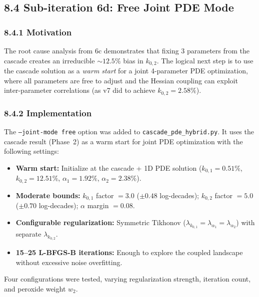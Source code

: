 \documentclass[11pt]{article}
\begin{document}
\subsection*{8.4 Sub-iteration 6d: Free Joint PDE Mode}

\subsubsection*{8.4.1 Motivation}

The root cause analysis from 6c demonstrates that fixing 3 parameters from
the cascade creates an irreducible ${\sim}12.5\%$ bias in $k_{0,2}$.  The
logical next step is to use the cascade solution as a \emph{warm start}
for a joint 4-parameter PDE optimization, where all parameters are free
to adjust and the Hessian coupling can exploit inter-parameter correlations
(as v7 did to achieve $k_{0,2} = 2.58\%$).

\subsubsection*{8.4.2 Implementation}

The \texttt{--joint-mode free} option was added to
\texttt{cascade\_pde\_hybrid.py}.  It uses the cascade result (Phase~2)
as a warm start for joint PDE optimization with the following settings:

\begin{itemize}
  \item \textbf{Warm start:} Initialize at the cascade + 1D PDE solution
        ($k_{0,1} = 0.51\%$, $k_{0,2} = 12.51\%$, $\alpha_1 = 1.92\%$,
        $\alpha_2 = 2.38\%$).
  \item \textbf{Moderate bounds:} $k_{0,1}$ factor $= 3.0$ ($\pm 0.48$
        log-decades); $k_{0,2}$ factor $= 5.0$ ($\pm 0.70$ log-decades);
        $\alpha$ margin $= 0.08$.
  \item \textbf{Configurable regularization:} Symmetric Tikhonov
        ($\lambda_{k_{0,1}} = \lambda_{\alpha_1} = \lambda_{\alpha_2}$)
        with separate $\lambda_{k_{0,2}}$.
  \item \textbf{15--25 L-BFGS-B iterations:} Enough to explore the
        coupled landscape without excessive noise overfitting.
\end{itemize}

Four configurations were tested, varying regularization strength, iteration
count, and peroxide weight $w_2$.
\end{document}
